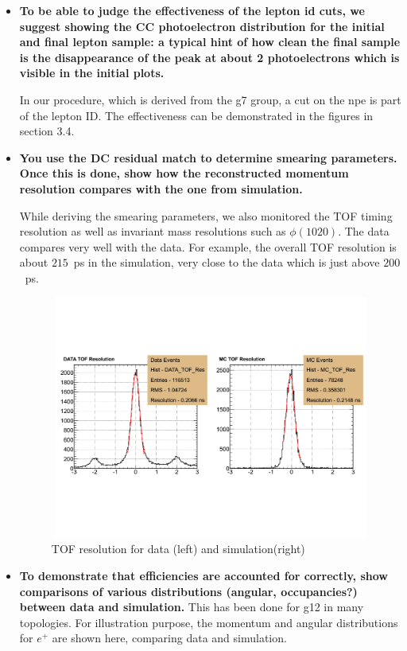 \documentclass[ 12 pt]{article}
\begin{document}
\begin{itemize}
\item \textbf{To be able to judge the effectiveness of the lepton id cuts, we suggest
showing the CC photoelectron distribution for the initial and final lepton
sample: a typical hint of how clean the final sample is the disappearance of
the peak at about 2 photoelectrons which is visible in the initial plots.}

In our procedure, which is derived from the g7 group, a cut on the npe is part of the lepton ID. The effectiveness can be demonstrated in the figures in section 3.4.




\item \textbf{You use the DC residual match to determine smearing parameters. Once this
is done, show how the reconstructed momentum resolution compares with
the one from simulation.}

While deriving the smearing parameters, we also monitored the TOF timing resolution as well as invariant mass resolutions such as $\phi(1020)$. The data compares very well with the data. For example, the overall TOF resolution is about $215$~ps in the simulation, very close to the data which is just above $200$~ps.

\begin{figure}[h!]\begin{center}
\includegraphics[width=12cm,height=8cm]{figures/calib/tof/TOF_gpp.pdf}
\caption[]{ TOF resolution for data (left) and simulation(right)}
\end{center}\end{figure}

\item \textbf{To demonstrate that efficiencies are accounted for correctly, show
comparisons of various distributions (angular, occupancies?) between data
and simulation.}
This has been done for g12 in many topologies. For illustration purpose, the momentum and angular distributions for $e^+$ are shown here, comparing data and simulation.


\end{itemize}
\end{document}
